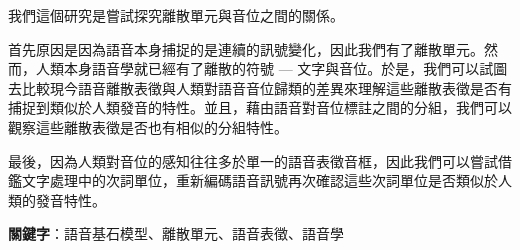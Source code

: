 
        我們這個研究是嘗試探究離散單元與音位之間的關係。

        首先原因是因為語音本身捕捉的是連續的訊號變化，因此我們有了離散單元。然而，人類本身語音學就已經有了離散的符號 --- 文字與音位。於是，我們可以試圖去比較現今語音離散表徵與人類對語音音位歸類的差異來理解這些離散表徵是否有捕捉到類似於人類發音的特性。並且，藉由語音對音位標註之間的分組，我們可以觀察這些離散表徵是否也有相似的分組特性。

        最後，因為人類對音位的感知往往多於單一的語音表徵音框，因此我們可以嘗試借鑑文字處理中的次詞單位，重新編碼語音訊號再次確認這些次詞單位是否類似於人類的發音特性。

\textbf{關鍵字}：語音基石模型、離散單元、語音表徵、語音學
